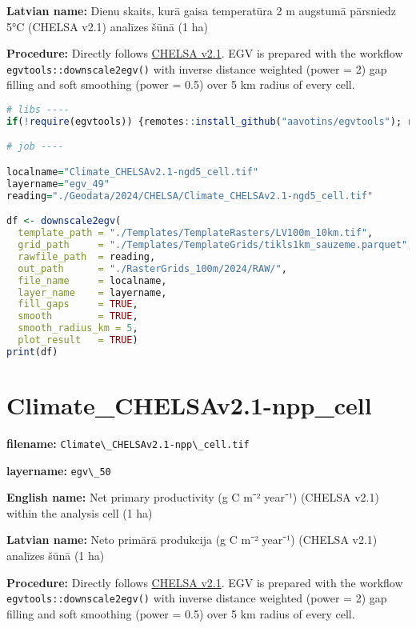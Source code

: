 \documentclass[
]{book}
\newcommand{\passthrough}[1]{#1}
\begin{document}
\textbf{Latvian name:} Dienu skaits, kurā gaisa temperatūra 2 m augstumā pārsniedz 5°C (CHELSA v2.1) analīzes šūnā (1 ha)

\textbf{Procedure:} Directly follows \hyperref[Ch04.11]{CHELSA v2.1}. EGV is prepared with the
workflow \passthrough{\lstinline!egvtools::downscale2egv()!} with inverse distance weighted (power = 2)
gap filling and soft smoothing (power = 0.5) over 5 km radius of every cell.

\begin{lstlisting}[language=R]
# libs ----
if(!require(egvtools)) {remotes::install_github("aavotins/egvtools"); require(egvtools)}

# job ----

localname="Climate_CHELSAv2.1-ngd5_cell.tif"
layername="egv_49"
reading="./Geodata/2024/CHELSA/Climate_CHELSAv2.1-ngd5_cell.tif"

df <- downscale2egv(
  template_path = "./Templates/TemplateRasters/LV100m_10km.tif",
  grid_path     = "./Templates/TemplateGrids/tikls1km_sauzeme.parquet",
  rawfile_path  = reading,
  out_path      = "./RasterGrids_100m/2024/RAW/",
  file_name     = localname,
  layer_name    = layername,
  fill_gaps     = TRUE,
  smooth        = TRUE,
  smooth_radius_km = 5,
  plot_result   = TRUE)
print(df)
\end{lstlisting}

\section{Climate\_CHELSAv2.1-npp\_cell}\label{ch06.050}

\textbf{filename:} \passthrough{\lstinline!Climate\_CHELSAv2.1-npp\_cell.tif!}

\textbf{layername:} \passthrough{\lstinline!egv\_50!}

\textbf{English name:} Net primary productivity (g C m⁻² year⁻¹) (CHELSA v2.1) within the analysis cell (1 ha)

\textbf{Latvian name:} Neto primārā produkcija (g C m⁻² year⁻¹) (CHELSA v2.1) analīzes šūnā (1 ha)

\textbf{Procedure:} Directly follows \hyperref[Ch04.11]{CHELSA v2.1}. EGV is prepared with the
workflow \passthrough{\lstinline!egvtools::downscale2egv()!} with inverse distance weighted (power = 2)
gap filling and soft smoothing (power = 0.5) over 5 km radius of every cell.
\end{document}
